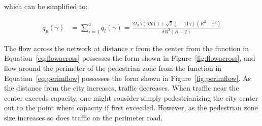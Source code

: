\documentclass{article}
\begin{document}
\noindent which can be simplified to:

\begin{align}
	    q_p(\gamma) & = \sum\limits_{i=1}^4 q_i(\gamma) = \frac{2\lambda_b \gamma \left(6R(1+\sqrt{2}) - 11\gamma\right) \left(R^2 - \gamma^2\right)}{\delta R^2(R-2)}
    \label{eq:perimflow}
\end{align}


\noindent The flow across the network at distance $r$ from the center from the function in Equation~\eqref{eq:flowacross} possesses the form shown in Figure~\ref{fig:flowacross}, and flow around the perimeter of the pedestrian zone from the function in Equation~\eqref{eq:perimflow} possesses the form shown in Figure~\ref{fig:perimflow}. As the distance from the city increases, traffic decreases. When traffic near the center exceeds capacity, one might consider simply pedestrianizing the city center out to the point where capacity if first exceeded. However, as the pedestrian zone size increases so does traffic on the perimeter road. 
\end{document}
